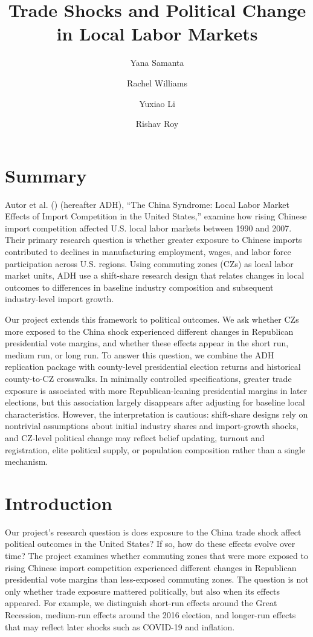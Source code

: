\documentclass[
  11pt,
]{article}
\title{Trade Shocks and Political Change in Local Labor Markets}
\author{Yana Samanta \and Rachel Williams \and Yuxiao Li \and Rishav
Roy}
\date{}
\begin{document}
\maketitle


\section{Summary}\label{summary}

Autor et al. () (hereafter ADH),
``The China Syndrome: Local Labor Market Effects of Import Competition
in the United States,'' examine how rising Chinese import competition
affected U.S. local labor markets between 1990 and 2007. Their primary
research question is whether greater exposure to Chinese imports
contributed to declines in manufacturing employment, wages, and labor
force participation across U.S. regions. Using commuting zones (CZs) as
local labor market units, ADH use a shift-share research design that
relates changes in local outcomes to differences in baseline industry
composition and subsequent industry-level import growth.

Our project extends this framework to political outcomes. We ask whether
CZs more exposed to the China shock experienced different changes in
Republican presidential vote margins, and whether these effects appear
in the short run, medium run, or long run. To answer this question, we
combine the ADH replication package with county-level presidential
election returns and historical county-to-CZ crosswalks. In minimally
controlled specifications, greater trade exposure is associated with
more Republican-leaning presidential margins in later elections, but
this association largely disappears after adjusting for baseline local
characteristics. However, the interpretation is cautious: shift-share
designs rely on nontrivial assumptions about initial industry shares and
import-growth shocks, and CZ-level political change may reflect belief
updating, turnout and registration, elite political supply, or
population composition rather than a single mechanism.

\section{Introduction}\label{introduction}

Our project's research question is does exposure to the China trade
shock affect political outcomes in the United States? If so, how do
these effects evolve over time? The project examines whether commuting
zones that were more exposed to rising Chinese import competition
experienced different changes in Republican presidential vote margins
than less-exposed commuting zones. The question is not only whether
trade exposure mattered politically, but also when its effects appeared.
For example, we distinguish short-run effects around the Great
Recession, medium-run effects around the 2016 election, and longer-run
effects that may reflect later shocks such as COVID-19 and inflation.
\end{document}
